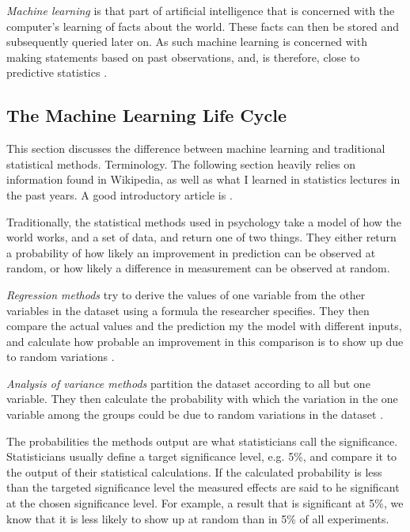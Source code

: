 \documentclass[a4paper,man,12pt,apacite,floatsintext,draftfirst]{apa6} %
\begin{document}
\emph{Machine learning} is that part of artificial intelligence that
is concerned with the computer's learning of facts about the world.
These facts can then be stored and subsequently queried later on.
As such machine learning is concerned with making statements based
on past observations, and, is therefore, close to predictive statistics
\cite{wpML}.

\subsection{The Machine Learning Life Cycle}
This section discusses the difference between machine learning and traditional
statistical methods. Terminology.
The following section heavily relies on information found in Wikipedia, as
well as what I learned in statistics lectures in the past years.
A good introductory article is \cite{wpML}.

Traditionally, the statistical methods used in psychology
take a model of how the world works, and a set of data, and return one of
two things.
They either return a probability of how likely an improvement in prediction
can be observed at random, or how likely a difference in measurement can be
observed at random.

\emph{Regression methods} try to derive the values of
one variable from the other variables in the dataset using a formula the
researcher specifies.
They then compare the actual values and the prediction my the model with
different inputs, and calculate how probable an improvement in this
comparison is to show up due to random variations \cite{wpRA}.

\emph{Analysis of variance methods} partition the dataset
according to all but one variable. They then calculate the probability with
which the variation in the one variable among the groups could be due to
random variations in the dataset \cite{wpAOV}.

The probabilities the methods output are what statisticians call the
significance. Statisticians usually define a target significance level,
e.g. 5\%, and compare it to the output of their statistical calculations.
If the calculated probability is less than the targeted significance level the
measured effects are said to he significant at the chosen significance level.
For example, a result that is significant at 5\%, we know that it is less
likely to show up at random than in 5\% of all experiments.
\end{document}
